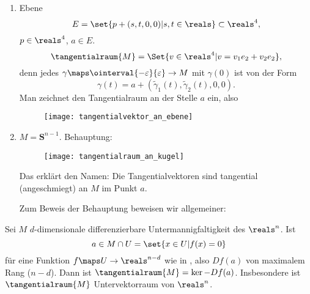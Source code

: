 \begin{beispiele*}
  \begin{enumerate}
    \item Ebene
    \begin{equation*}
      E=\set{p+(s,t,0,0)|s,t\in \reals}\subset \reals^4,
    \end{equation*}
    \( p\in \reals^4 \), \( a\in E \).
    \begin{equation*}
      \tangentialraum{M}=\Set{v\in \reals^4|v=v_1e_2+v_2e_2},
    \end{equation*}
    denn jedes \( \gamma\maps \ointerval{-\varepsilon}{\varepsilon}\to M \) mit \( \gamma(0) \) ist von der Form
    \begin{equation*}
      \gamma(t)=a+(\tilde{\gamma}_1(t),\tilde{\gamma}_2(t),0,0).
    \end{equation*}
    Man zeichnet den Tangentialraum an der Stelle \( a \) ein, also
    \begin{figure}[H]
      \centering
      \texttt{[image: tangentialvektor\_an\_ebene]}
      \label{fig:tangentialvektor_an_ebene}
    \end{figure}
    \item \( M=\mathbf{S}^{n-1} \). Behauptung: 
    \begin{figure}[H]
      \centering
      \texttt{[image: tangentialraum\_an\_kugel]}
      \label{fig:tangentialraum_an_kugel}
    \end{figure}
    Das erklärt den Namen: Die Tangentialvektoren sind tangential (angeschmiegt) an \( M \) im Punkt \( a \).
    
    Zum Beweis der Behauptung beweisen wir allgemeiner:
  \end{enumerate}
\end{beispiele*}
\begin{satz}\label{tangentialraum_ist_tangential}
  Sei \( M \) \( d \)-dimensionale differenzierbare Untermannigfaltigkeit des \( \reals^n \). Ist 
  \begin{equation*}
    a\in M\cap U =\set{x\in U |f(x)=0}
  \end{equation*}
  für eine Funktion \( f\maps U\to \reals^{n-d} \) wie in , also \( Df(a) \) von maximalem Rang (\( n-d \)). Dann ist \( \tangentialraum{M}=\ker-{Df(a)} \). Insbesondere ist \( \tangentialraum{M} \) Untervektorraum von \( \reals^n \).
\end{satz}
